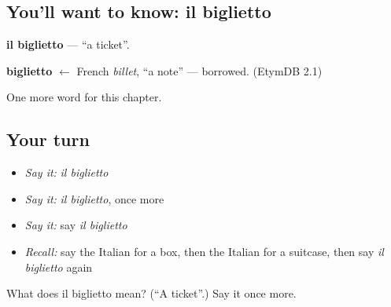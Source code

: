 \subsection*{You'll want to know: il biglietto}
\textbf{il biglietto} — \textquotedblleft{}a ticket\textquotedblright{}.

\begin{cousinweb}
\textbf{biglietto} $\leftarrow$ French \emph{billet}, \textquotedblleft{}a note\textquotedblright{} — borrowed. (EtymDB 2.1)
\end{cousinweb}

\begin{grammarlens}[title={What you've built}]
One more word for this chapter.
\end{grammarlens}

\subsection*{Your turn}
\begin{itemize}
\raggedright
  \item \emph{Say it:} \emph{il biglietto}
  \item \emph{Say it:} \emph{il biglietto}, once more
  \item \emph{Say it:} say \emph{il biglietto}
  \item \emph{Recall:} say the Italian for a box, then the Italian for a suitcase, then say \emph{il biglietto} again
\end{itemize}

\begin{tcolorbox}[breakable,colback=teal!4,colframe=teal!35!black,title={Before you move on}]
What does il biglietto mean? (\textquotedblleft{}A ticket\textquotedblright{}.) Say it once more.
\end{tcolorbox}
